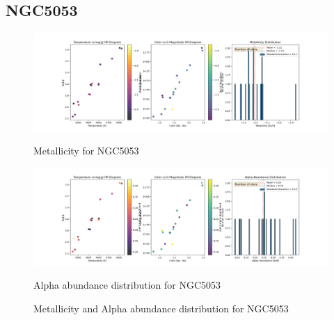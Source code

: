 \documentclass[a4paper,12pt]{article}
\begin{document}
\subsection{NGC5053}
\begin{figure}[H]
    \centering
    \begin{minipage}[b]{0.8\textwidth}
        \centering
        \includegraphics[width=\textwidth]{NGC5053_metalicity.png}
        \caption{Metallicity for NGC5053}
        \label{fig:NGC5053_metalicity}
    \end{minipage}
    \hfill
    \begin{minipage}[b]{0.8\textwidth}
        \centering
        \includegraphics[width=\textwidth]{NGC5053_alpha.png}
        \caption{Alpha abundance distribution for NGC5053}
        \label{fig:NGC5053_alpha}
    \end{minipage}
    \caption{Metallicity and Alpha abundance distribution for NGC5053}
    \label{fig:NGC5053_combined}
\end{figure}
\clearpage
\end{document}
